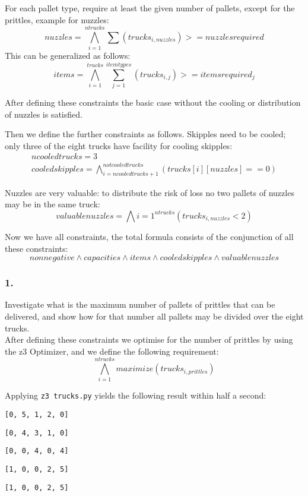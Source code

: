 \documentclass[12pt]{article}
\begin{document}
For each pallet type, require at least the given number of pallets, except for the prittles, example for nuzzles:
\[ nuzzles = \bigwedge_{i=1}^{ntrucks} \sum_{} ( trucks_{i,nuzzles} ) >= nuzzlesrequired \]
This can be generalized as follows:
\[ items = \bigwedge_{i=1}^{trucks} \sum_{j=1}^{itemtypes} ( trucks_{i,j} ) >= itemsrequired_j  \]

After defining these constraints the basic case without the cooling or distribution of nuzzles is satisfied.

Then we define the further constraints as follows.
Skipples need to be cooled; only three of the eight trucks have facility for cooling skipples:\\
\begin{align}
ncooledtrucks = 3 \\
cooledskipples = \bigwedge_{i=ncooledtrucks + 1}^{notcooledtrucks} (trucks[i][nuzzles] == 0)
 \end{align}

Nuzzles are very valuable: to distribute the risk of loss no two pallets of nuzzles may be in the same truck:
\[ valuablenuzzles = \bigwedge{i=1}^{ntrucks} (trucks_{i,nuzzles} < 2) \]

Now we have all constraints, the total formula consists of the conjunction of all these constraints:
\[ nonnegative \wedge capacities \wedge items \wedge cooledskipples \wedge valuablenuzzles  \]

\subsubsection*{1.}

Investigate what is the maximum number of pallets of prittles that can be delivered,
and show how for that number all pallets may be divided over the eight trucks. \\

After defining these constraints we optimise for the number of prittles by using the z3 Optimizer, and we
define the following requirement:
\[ \bigwedge_{i=1}^{ntrucks} maximize(trucks_{i,prittles}) \]

Applying {\tt z3 trucks.py} yields the following result within half a second:
 
{\tt [0, 5, 1, 2, 0] }

{\tt [0, 4, 3, 1, 0] }

{\tt [0, 0, 4, 0, 4] }

{\tt [1, 0, 0, 2, 5] }

{\tt [1, 0, 0, 2, 5] }
\end{document}
